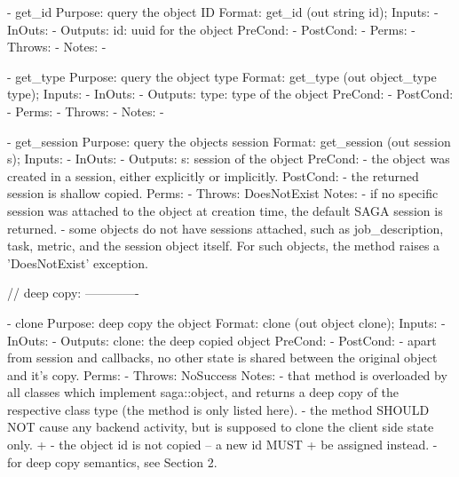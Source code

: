  \begin{myspec}
    - get_id
      Purpose:  query the object ID
      Format:   get_id               (out string id);
      Inputs:   -
      InOuts:   -
      Outputs:  id:                   uuid for the object
      PreCond:  -
      PostCond: -
      Perms:    -
      Throws:   -
      Notes:    - 
 
 
    - get_type
      Purpose:  query the object type
      Format:   get_type             (out object_type type);
      Inputs:   -
      InOuts:   -
      Outputs:  type:                 type of the object
      PreCond:  -
      PostCond: -
      Perms:    -
      Throws:   -
      Notes:    - 
 
 
    - get_session
      Purpose:  query the objects session
      Format:   get_session          (out session s);
      Inputs:   -
      InOuts:   -
      Outputs:  s:                    session of the object
      PreCond:  - the object was created in a session, either
                  explicitly or implicitly.
      PostCond: - the returned session is shallow copied.
      Perms:    -
      Throws:   DoesNotExist
      Notes:    - if no specific session was attached to the
                  object at creation time, the default SAGA
                  session is returned.
                - some objects do not have sessions attached,
                  such as job_description, task, metric, and the
                  session object itself.  For such objects, the
                  method raises a 'DoesNotExist' exception.
 
 
    // deep copy:
    -------------
 
    - clone
      Purpose:  deep copy the object
      Format:   clone                (out object clone);
      Inputs:   -
      InOuts:   -
      Outputs:  clone:                the deep copied object
      PreCond:  -
      PostCond: - apart from session and callbacks, no other
                  state is shared between the original object 
                  and it's copy.
      Perms:    -
      Throws:   NoSuccess
      Notes:    - that method is overloaded by all classes 
                  which implement saga::object, and returns 
                  a deep copy of the respective class type 
                  (the method is only listed here).
                - the method SHOULD NOT cause any backend 
                  activity, but is supposed to clone the client
                  side state only.
+               - the object id is not copied -- a new id MUST 
+                 be assigned instead.
                - for deep copy semantics, see Section 2.
 \end{myspec}
 
